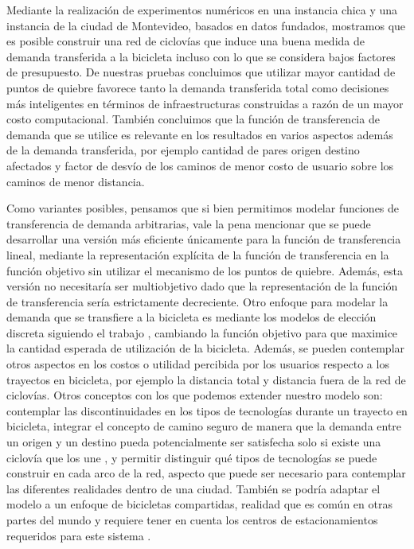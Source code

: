 Mediante la realización de experimentos numéricos en una instancia chica y una instancia de la ciudad de Montevideo, basados en datos fundados, mostramos que es posible construir una red de ciclovías que induce una buena medida de demanda transferida a la bicicleta incluso con lo que se considera bajos factores de presupuesto. De nuestras pruebas concluimos que utilizar mayor cantidad de puntos de quiebre favorece tanto la demanda transferida total como decisiones más inteligentes en términos de infraestructuras construidas a razón de un mayor costo computacional. También concluimos que la función de transferencia de demanda que se utilice es relevante en los resultados en varios aspectos además de la demanda transferida, por ejemplo cantidad de pares origen destino afectados y factor de desvío de los caminos de menor costo de usuario sobre los caminos de menor distancia.

Como variantes posibles, pensamos que si bien permitimos modelar funciones de transferencia de demanda arbitrarias, vale la pena mencionar que se puede desarrollar una versión más eficiente únicamente para la función de transferencia lineal, mediante la representación explícita de la función de transferencia en la función objetivo sin utilizar el mecanismo de los puntos de quiebre. Además, esta versión no necesitaría ser multiobjetivo dado que la representación de la función de transferencia sería estrictamente decreciente. Otro enfoque para modelar la demanda que se transfiere a la bicicleta es mediante los modelos de elección discreta siguiendo el trabajo \textcite{Pacheco2021}, cambiando la función objetivo para que maximice la cantidad esperada de utilización de la bicicleta. Además, se pueden contemplar otros aspectos en los costos o utilidad percibida por los usuarios respecto a los trayectos en bicicleta, por ejemplo la distancia total y distancia fuera de la red de ciclovías. Otros conceptos con los que podemos extender nuestro modelo son: contemplar las discontinuidades en los tipos de tecnologías \parencite{baya2021} durante un trayecto en bicicleta, integrar el concepto de camino seguro de manera que la demanda entre un origen y un destino pueda potencialmente ser satisfecha solo si existe una ciclovía que los une \parencite{Duthie2014}, y permitir distinguir qué tipos de tecnologías se puede construir en cada arco de la red, aspecto que puede ser necesario para contemplar las diferentes realidades dentro de una ciudad. También se podría adaptar el modelo a un enfoque de bicicletas compartidas, realidad que es común en otras partes del mundo y requiere tener en cuenta los centros de estacionamientos requeridos para este sistema \parencite{vogel2016}.

